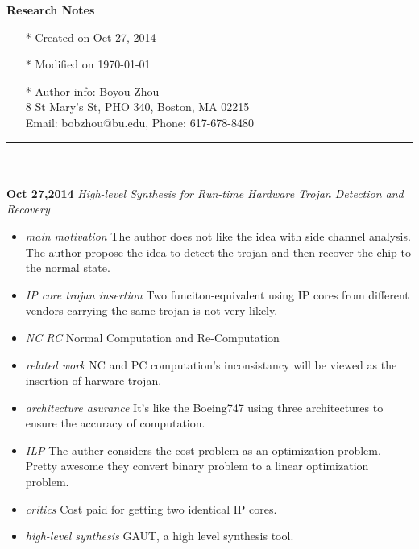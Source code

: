\documentclass[]{article}
\begin{document}
\pagestyle{empty}
{\large\textbf{Research Notes}}
\begin{itemize}
    \item[*] Created on Oct 27, 2014
    \item[*] Modified on \today
    \item[*] Author info: Boyou Zhou\\
             8 St Mary's St, PHO 340, Boston, MA 02215\\
             Email: bobzhou@bu.edu, Phone: 617-678-8480
\end{itemize}


\rule[-0.1cm]{7.5in}{0.01cm}\\
\\
\noindent \textbf{Oct 27,2014}
\textit{High-level Synthesis for Run-time Hardware Trojan Detection and
Recovery}
\indent		\begin{itemize}
            \item \textit{main motivation} The author does not like the idea
            with side channel analysis. The author propose the idea to detect
            the trojan and then recover the chip to the normal state. 
            \item \textit{IP core trojan insertion} Two funciton-equivalent
            using IP cores from different vendors carrying the same trojan is
            not very likely.  
            \item \textit{NC RC} Normal Computation and Re-Computation
            \item \textit{related work} NC and PC computation's inconsistancy
            will be viewed as the insertion of harware trojan.
            \item \textit{architecture asurance} It's like the Boeing747 using
            three architectures to ensure the accuracy of computation.
            \item \textit{ILP} The auther considers the cost problem as an
            optimization problem. Pretty awesome they convert binary problem to
            a linear optimization problem.
            \item \textit{critics} Cost paid for getting two identical IP
            cores.
            \item \textit{high-level synthesis} GAUT, a high level synthesis
            tool.
        \end{itemize}
\end{document}
